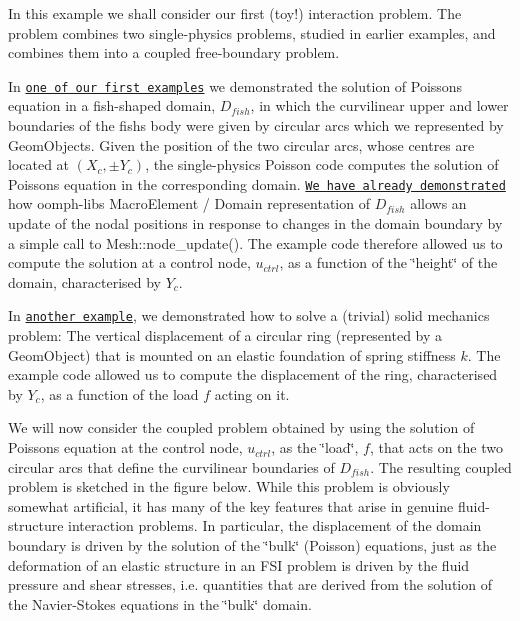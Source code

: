 In this example we shall consider our first (toy!) interaction problem. The problem combines two single-\/physics problems, studied in earlier examples, and combines them into a coupled free-\/boundary problem.


\begin{DoxyItemize}
\item In \href{../../../poisson/fish_poisson/html/index.html}{\tt one of our first examples} we demonstrated the solution of Poisson\textquotesingle{}s equation in a fish-\/shaped domain, $ D_{fish} $, in which the curvilinear upper and lower boundaries of the fish\textquotesingle{}s body were given by circular arcs which we represented by {\ttfamily Geom\+Objects}. Given the position of the two circular arcs, whose centres are located at $ (X_c, \pm Y_c) $, the single-\/physics Poisson code computes the solution of Poisson\textquotesingle{}s equation in the corresponding domain. \href{../../../poisson/fish_poisson2/html/index.html#com}{\tt We have already demonstrated} how {\ttfamily oomph-\/lib\textquotesingle{}s} {\ttfamily Macro\+Element} / {\ttfamily Domain} representation of $ D_{fish} $ allows an update of the nodal positions in response to changes in the domain boundary by a simple call to {\ttfamily Mesh\+::node\+\_\+update()}. The example code therefore allowed us to compute the solution at a control node, $ u_{ctrl}$, as a function of the \char`\"{}height\char`\"{} of the domain, characterised by $ Y_c $. ~\newline
~\newline

\item In \href{../../../interaction/circle_as_element/html/index.html}{\tt another example}, we demonstrated how to solve a (trivial) solid mechanics problem\+: The vertical displacement of a circular ring (represented by a {\ttfamily Geom\+Object}) that is mounted on an elastic foundation of spring stiffness $ k $. The example code allowed us to compute the displacement of the ring, characterised by $ Y_c $, as a function of the load $ f $ acting on it.
\end{DoxyItemize}We will now consider the coupled problem obtained by using the solution of Poisson\textquotesingle{}s equation at the control node, $ u_{ctrl} $, as the \char`\"{}load\char`\"{}, $ f $, that acts on the two circular arcs that define the curvilinear boundaries of $ D_{fish} $. The resulting coupled problem is sketched in the figure below. While this problem is obviously somewhat artificial, it has many of the key features that arise in genuine fluid-\/structure interaction problems. In particular, the displacement of the domain boundary is driven by the solution of the \char`\"{}bulk\char`\"{} (Poisson) equations, just as the deformation of an elastic structure in an F\+SI problem is driven by the fluid pressure and shear stresses, i.\+e. quantities that are derived from the solution of the Navier-\/\+Stokes equations in the \char`\"{}bulk\char`\"{} domain.

